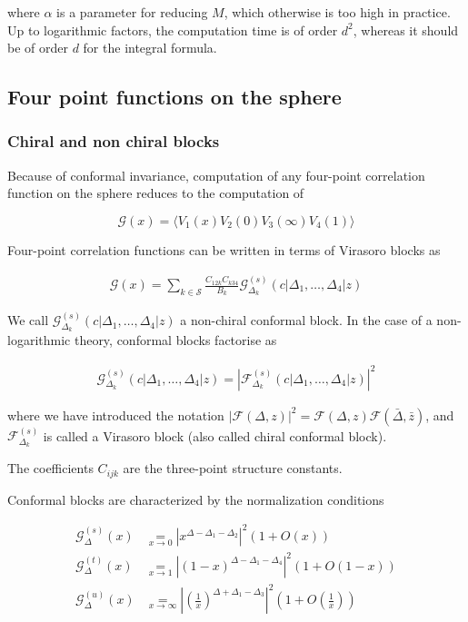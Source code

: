 \documentclass[a4paper]{article}
\numberwithin{equation}{section}
\begin{document}
where \(\alpha\) is a parameter for reducing \(M\), which otherwise is too high in practice.
Up to logarithmic factors, the computation time is of order \(d^2\), whereas it should be of order \(d\) for the integral formula.
\subsection{Four point functions on the sphere}
\label{sec:orgd9af94c}

\subsubsection*{Chiral and non chiral blocks}
\label{sec:orgc75b474}

Because of conformal invariance, computation of any four-point correlation function on the sphere reduces to the computation of

$$ \mathcal G(x) = \langle V_{1}(x) V_{2}(0) V_{3}(\infty) V_{4}(1) \rangle $$

Four-point correlation functions can be written in terms of Virasoro blocks as

\begin{align}
  \mathcal G(x) = \sum_{k \in \mathcal S} \frac{C_{12k} C_{k34}}{B_{k}} \mathcal G_{\Delta_k}^{(s)}(c |\Delta_{1}, \dots, \Delta_{4}|z)\end{align}

We call \(\mathcal G_{\Delta_k}^{(s)}(c |\Delta_{1}, \dots, \Delta_{4}|z)\) a non-chiral conformal block.
In the case of a non-logarithmic theory, conformal blocks factorise as

\begin{align}
  \mathcal G_{\Delta_k}^{(s)}(c |\Delta_{1}, \dots, \Delta_{4}|z) = \left| \mathcal F^{(s)}_{\Delta_{k}}(c | \Delta_{1}, \dots, \Delta_{4} | z) \right|^{2}
\end{align}

where we have introduced the notation \(\left|\mathcal F(\Delta, z)\right|^2 = \mathcal{F}(\Delta, z) \mathcal{F}(\bar\Delta, \bar z)\), and \(\mathcal F^{(s)}_{\Delta_k}\) is called a Virasoro block (also called chiral conformal block).

The coefficients \(C_{ijk}\) are the three-point structure constants.

Conformal blocks are characterized by the normalization conditions

\begin{align}
 \mathcal{G}^{(s)}_\Delta(x) & \underset{x\to 0}{=} \left| x^{\Delta-\Delta_1-\Delta_2}\right|^2 \left(1+O(x)\right)
 \\
 \mathcal{G}^{(t)}_\Delta(x) & \underset{x\to 1}{=} \left|(1-x)^{\Delta-\Delta_1-\Delta_4}\right|^2 \left(1+O(1-x)\right)
 \\
 \mathcal{G}^{(u)}_\Delta(x) & \underset{x\to \infty}{=} \left|\left(\frac{1}{x}\right)^{\Delta+\Delta_1-\Delta_3} \right|^2\left(1+O\left(\frac{1}{x}\right)\right)
\end{align}
\end{document}
